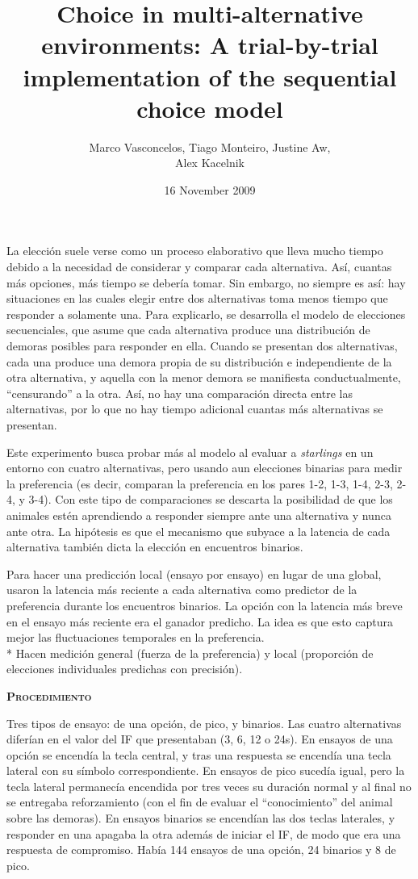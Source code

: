 \documentclass[a4paper,12pt]{article}
\title{Choice in multi-alternative environments: A trial-by-trial implementation of the sequential choice model}
\author{Marco Vasconcelos, Tiago Monteiro, Justine Aw,\\Alex Kacelnik}
\date{16 November 2009}
\begin{document}
{\scshape\bfseries \maketitle}

La elección suele verse como un proceso elaborativo que lleva mucho tiempo debido a la necesidad de considerar y comparar cada alternativa. Así, cuantas más opciones, más tiempo se debería tomar. Sin embargo, no siempre es así: hay situaciones en las cuales elegir entre dos alternativas toma menos tiempo que responder a solamente una. Para explicarlo, se desarrolla el modelo de elecciones secuenciales, que asume que cada alternativa produce una distribución de demoras posibles para responder en ella. Cuando se presentan dos alternativas, cada una produce una demora propia de su distribución e independiente de la otra alternativa, y aquella con la menor demora se manifiesta conductualmente, ``censurando'' a la otra. Así, no hay una comparación directa entre las alternativas, por lo que no hay tiempo adicional cuantas más alternativas se presentan.

Este experimento busca probar más al modelo al evaluar a {\slshape starlings} en un entorno con cuatro alternativas, pero usando aun elecciones binarias para medir la preferencia (es decir, comparan la preferencia en los pares 1-2, 1-3, 1-4, 2-3, 2-4, y 3-4). Con este tipo de comparaciones se descarta la posibilidad de que los animales estén aprendiendo a responder siempre ante una alternativa y nunca ante otra. La hipótesis es que el mecanismo que subyace a la latencia de cada alternativa también dicta la elección en encuentros binarios.

Para hacer una predicción local (ensayo por ensayo) en lugar de una global, usaron la latencia más reciente a cada alternativa como predictor de la preferencia durante los encuentros binarios. La opción con la latencia más breve en el ensayo más reciente era el ganador predicho. La idea es que esto captura mejor las fluctuaciones temporales en la preferencia.\\*
Hacen medición general (fuerza de la preferencia) y local (proporción de elecciones individuales predichas con precisión).

{\scshape\bfseries Procedimiento}

Tres tipos de ensayo: de una opción, de pico, y binarios. Las cuatro alternativas diferían en el valor del IF que presentaban (3, 6, 12 o 24s). En ensayos de una opción se encendía la tecla central, y tras una respuesta se encendía una tecla lateral con su símbolo correspondiente. En ensayos de pico sucedía igual, pero la tecla lateral permanecía encendida por tres veces su duración normal y al final no se entregaba reforzamiento (con el fin de evaluar el ``conocimiento'' del animal sobre las demoras). En ensayos binarios se encendían las dos teclas laterales, y responder en una apagaba la otra además de iniciar el IF, de modo que era una respuesta de compromiso. Había 144 ensayos de una opción, 24 binarios y 8 de pico.
\end{document}
